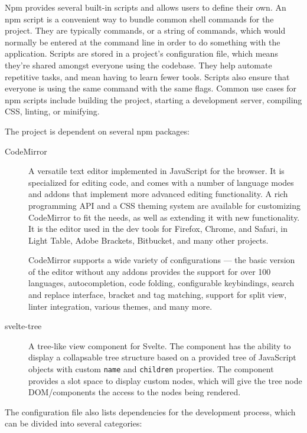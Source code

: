 \documentclass[english,engineering]{wizthesis}
\newcommand{\paraphrase}[1]{#1}
\begin{document}
Npm provides several built-in scripts and allows users to define their own.
\paraphrase{An npm script is a convenient way to bundle common shell commands
for the project. They are typically commands, or a string of commands, which
would normally be entered at the command line in order to do something with the
application. Scripts are stored in a project's configuration file, which means
they're shared amongst everyone using the codebase. They help automate
repetitive tasks, and mean having to learn fewer tools. Scripts also ensure that
everyone is using the same command with the same flags. Common use cases for npm
scripts include building the project, starting a development server, compiling
CSS, linting, or minifying.}

The project is dependent on several npm packages:
\begin{description}
  \item[CodeMirror] \cite{codemirror} \paraphrase{A versatile text editor
  implemented in JavaScript for the browser. It is specialized for editing code,
  and comes with a number of language modes and addons that implement more
  advanced editing functionality. A rich programming API and a CSS theming
  system are available for customizing CodeMirror to fit the needs, as well as
  extending it with new functionality. It is the editor used in the dev tools
  for Firefox, Chrome, and Safari, in Light Table, Adobe Brackets, Bitbucket,
  and many other projects.}

  CodeMirror supports a wide variety of configurations --- the basic version of
  the editor without any addons provides the support for over 100 languages,
  autocompletion, code folding, configurable keybindings, search and replace
  interface, bracket and tag matching, support for split view, linter
  integration, various themes, and many more.
  \item[svelte-tree] A tree-like view component for Svelte. The component has
  the ability to display a collapsable tree structure based on a provided tree
  of JavaScript objects with custom \texttt{name} and \texttt{children}
  properties. The component provides a slot space to display custom nodes, which
  will give the tree node DOM/components the access to the nodes being rendered.
\end{description}
The configuration file also lists dependencies for the development process,
which can be divided into several categories:
\end{document}
